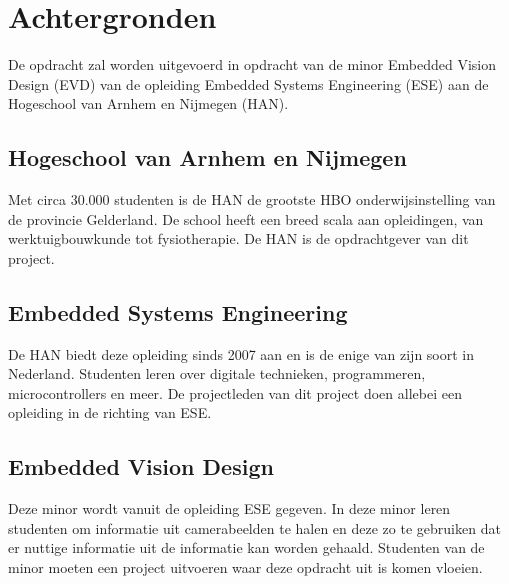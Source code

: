 \chapter{Achtergronden}

De opdracht zal worden uitgevoerd in opdracht van de minor Embedded Vision
Design (EVD) van de opleiding Embedded Systems Engineering (ESE) aan de
Hogeschool van Arnhem en Nijmegen (HAN).

\section{Hogeschool van Arnhem en Nijmegen}

Met circa 30.000 studenten is de HAN de grootste HBO onderwijsinstelling van de
provincie Gelderland. De school heeft een breed scala aan opleidingen, van
werktuigbouwkunde tot fysiotherapie. De HAN is de opdrachtgever van dit project.

\section{Embedded Systems Engineering}

De HAN biedt deze opleiding sinds 2007 aan en is de enige van zijn soort in
Nederland. Studenten leren over digitale technieken, programmeren,
microcontrollers en meer. De projectleden van dit project doen allebei een
opleiding in de richting van ESE.

\section{Embedded Vision Design}

Deze minor wordt vanuit de opleiding ESE gegeven. In deze minor leren studenten
om informatie uit camerabeelden te halen en deze zo te gebruiken dat er nuttige
informatie uit de informatie kan worden gehaald. Studenten van de minor moeten
een project uitvoeren waar deze opdracht uit is komen vloeien.
